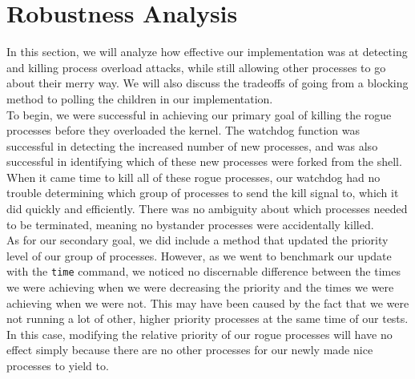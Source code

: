 \documentclass{article}
\begin{document}


\section{Robustness Analysis}

In this section, we will analyze how effective our implementation was at
detecting and killing process overload attacks, while still allowing other 
processes to go about their merry way. We will also discuss the tradeoffs of
going from a blocking method to polling the children in our implementation. \\

To begin, we were successful in achieving our primary goal of killing the rogue
processes before they overloaded the kernel. The watchdog function was 
successful in detecting the increased number of new processes, and was also 
successful in identifying which of these new processes were forked from the
shell. When it came time to kill all of these rogue processes, our watchdog had
no trouble determining which group of processes to send the kill signal to,
which it did quickly and efficiently. There was no ambiguity about which 
processes needed to be terminated, meaning no bystander processes were 
accidentally killed. \\
As for our secondary goal, we did include a method that updated the priority
level of our group of processes. However, as we went to benchmark our update
with the \verb+time+ command, we noticed no discernable difference between the
times we were achieving when we were decreasing the priority and the times we
were achieving when we were not. This may have been caused by the fact that we 
were not running a lot of other, higher priority processes at the same time of
our tests. In this case, modifying the relative priority of our rogue processes
will have no effect simply because there are no other processes for our newly 
made nice processes to yield to. \\
\end{document}
